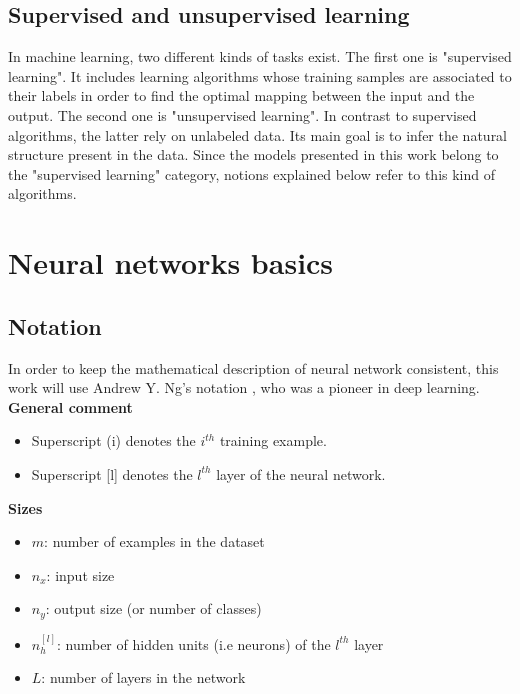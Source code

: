\subsection{Supervised and unsupervised learning}
In machine learning, two different kinds of tasks exist. The first one is "supervised learning". It includes learning algorithms whose training samples are associated to their labels in order to find the optimal mapping between the input and the output. The second one is "unsupervised learning". In contrast to supervised algorithms, the latter rely on unlabeled data. Its main goal is to infer the natural structure  present in the data. Since the models presented in this work belong to the "supervised learning" category, notions explained below refer to this kind of algorithms.


\section{Neural networks basics}

\subsection{Notation}
In order to keep the mathematical description of neural network consistent, this work will use Andrew Y. Ng's notation \cite{16}, who was a pioneer in deep learning.\\

\noindent \textbf{General comment}
\begin{itemize}
\item Superscript (i) denotes the $i^{th}$ training example.
\item Superscript [l] denotes the $l^{th}$ layer of the neural network.
\end{itemize}

\noindent \textbf{Sizes}
\begin{itemize}
\item $m$: number of examples in the dataset
\item $n_{x}$: input size
\item $n_{y}$: output size (or number of classes)
\item $n_{h}^{[l]}$: number of hidden units (i.e neurons) of the $l^{th}$ layer
\item $L$: number of layers in the network
\end{itemize}

